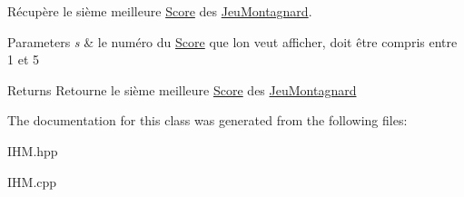 Récupère le sième meilleure \hyperlink{classScore}{Score} des \hyperlink{classJeuMontagnard}{Jeu\+Montagnard}. 


\begin{DoxyParams}{Parameters}
{\em s} & le numéro du \hyperlink{classScore}{Score} que l\textquotesingle{}on veut afficher, doit être compris entre 1 et 5 \\
\hline
\end{DoxyParams}
\begin{DoxyReturn}{Returns}
Retourne le sième meilleure \hyperlink{classScore}{Score} des \hyperlink{classJeuMontagnard}{Jeu\+Montagnard} 
\end{DoxyReturn}


The documentation for this class was generated from the following files\+:\begin{DoxyCompactItemize}
\item 
I\+H\+M.\+hpp\item 
I\+H\+M.\+cpp\end{DoxyCompactItemize}
